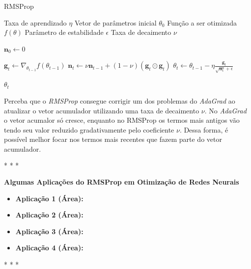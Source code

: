 \begin{algorithm}[H] %
    \caption{RMSProp}
    \label{alg:rmsprop}
    \begin{algorithmic}[1] %

    \Require Taxa de aprendizado $\eta$
    \Require Vetor de parâmetros inicial $\theta_0$
    \Require Função a ser otimizada $f(\theta)$
    \Require Parâmetro de estabilidade $\epsilon$
    \Require Taxa de decaimento $\nu$

    \State $\mathbf{n}_0 \leftarrow 0$ 

        \State $\textbf{g}_t \leftarrow \nabla_{\theta_{t-1}} f(\theta_{t-1})$
        \State $\textbf{n}_t \leftarrow \nu \textbf{n}_{t-1} + (1 - \nu) (\mathbf{g}_t \odot \mathbf{g}_t)$
        \State $\theta_t \leftarrow \theta_{t-1} - \eta \frac{\textbf{g}_t}{\sqrt{\textbf{n}_t} + \epsilon}$
    \EndWhile

    \State \Return $\theta_t$ 
    \end{algorithmic}
\end{algorithm}

Perceba que o \textit{RMSProp} consegue corrigir um dos problemas do \textit{AdaGrad} ao atualizar o vetor acumulador utilizando uma taxa de decaimento $\nu$. No \textit{AdaGrad} o vetor acumalor só cresce, enquanto no RMSProp os termos mais antigos vão tendo seu valor reduzido gradativamente pelo coeficiente $\nu$. Dessa forma, é possível melhor focar nos termos mais recentes que fazem parte do vetor acumulador.

\medskip
\begin{center}
 * * *
\end{center}
\medskip

\textbf{Algumas Aplicações do RMSProp em Otimização de Redes Neurais}
\vspace{1em}

\begin{itemize}
    \item \textbf{Aplicação 1 (Área):}
    \item \textbf{Aplicação 2 (Área):}
    \item \textbf{Aplicação 3 (Área):}
    \item \textbf{Aplicação 4 (Área):}
\end{itemize}

\medskip
\begin{center}
 * * *
\end{center}
\medskip


